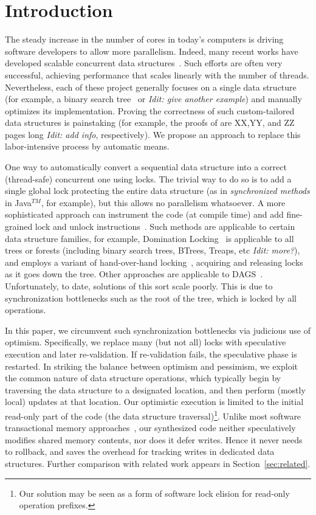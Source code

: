 \newcommand{\Idit}[1]{\emph{Idit: {#1}}}
\section{Introduction}

The steady increase in the number of  cores in today's computers is
driving software developers to allow more parallelism. Indeed, many
recent works have developed scalable concurrent data
structures~\cite{bronson,dana,citrus,etc}. Such efforts are often very
successful, achieving performance that scales linearly with the number
of threads. Nevertheless, each of these project generally focuses on a
single data structure (for example, a binary search tree~\cite{citrus}
or \Idit{give another example}) and manually optimizes its
implementation. Proving the correctness of such custom-tailored data
structures is painstaking (for example, the proofs of \cite{x,y,z} are
XX,YY, and ZZ pages long \Idit{add info}, respectively). We propose an
approach to replace this labor-intensive process by automatic means.

One way to automatically convert a sequential data structure into a
correct (thread-safe) concurrent one using locks. The trivial way to do
so is to add a single global lock protecting the entire data structure
(as in \emph{synchronized methods} in Java$^{TM}$, for example), but
this allows no parallelism whatsoever. A more sophisticated approach can
instrument the code (at compile time) and add fine-grained lock and
unlock instructions~\cite{domination,tree-locking,dag,etc}. Such methods
are applicable to certain data structure families, for example,
Domination Locking~\cite{domination} is applicable to all trees or
forests  (including binary search trees, BTrees, Treaps, etc
\Idit{more?}), and employs a variant of hand-over-hand
locking~\cite{hand-over-hand}, acquiring and releasing locks as it goes
down the tree.  Other approaches are applicable to
DAGS~\cite{dag-locking}. Unfortunately, to date, solutions of this sort
scale poorly. This is due to synchronization bottlenecks such as the
root of the tree, which is locked by all operations.

In this paper, we circumvent such synchronization bottlenecks via
judicious use of optimism. Specifically, we replace many (but not all)
locks with speculative execution and later re-validation. If
re-validation fails, the speculative phase is restarted. In striking the
balance between optimism and pessimism, we exploit the common nature of
data structure operations, which typically begin by traversing the data
structure to a designated location, and then perform (mostly local)
updates at that location. Our optimistic execution is limited to the
initial read-only part of the code (the data structure
traversal)\footnote{Our solution may be seen as a form of software lock
elision for read-only operation prefixes.}. Unlike most
software transactional memory approaches~\cite{stm,tls},  our
synthesized code neither speculatively modifies shared memory contents,
nor does it defer writes. Hence it never needs to rollback, and saves
the overhead for tracking writes in dedicated data structures. Further
comparison with related work appears in Section~\ref{sec:related}.


